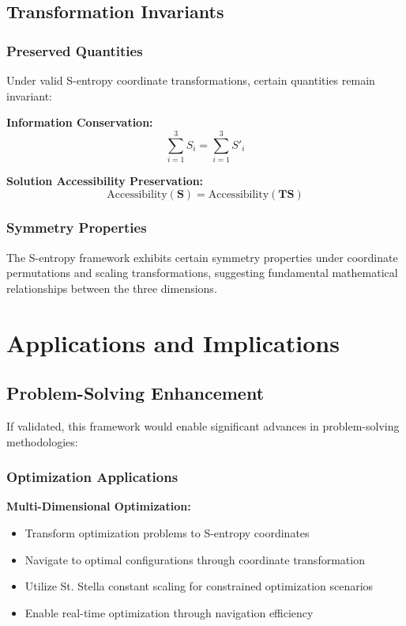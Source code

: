 \documentclass[11pt]{article}
\begin{document}
\subsection{Transformation Invariants}

\subsubsection{Preserved Quantities}

Under valid S-entropy coordinate transformations, certain quantities remain invariant:

\textbf{Information Conservation:}
\begin{equation}
\sum_{i=1}^{3} S_i = \sum_{i=1}^{3} S'_i
\label{eq:information_conservation}
\end{equation}

\textbf{Solution Accessibility Preservation:}
\begin{equation}
\text{Accessibility}(\mathbf{S}) = \text{Accessibility}(\mathbf{T}\mathbf{S})
\label{eq:accessibility_preservation}
\end{equation}

\subsubsection{Symmetry Properties}

The S-entropy framework exhibits certain symmetry properties under coordinate permutations and scaling transformations, suggesting fundamental mathematical relationships between the three dimensions.

\section{Applications and Implications}

\subsection{Problem-Solving Enhancement}

If validated, this framework would enable significant advances in problem-solving methodologies:

\subsubsection{Optimization Applications}

\textbf{Multi-Dimensional Optimization:}
\begin{itemize}
\item Transform optimization problems to S-entropy coordinates
\item Navigate to optimal configurations through coordinate transformation
\item Utilize St. Stella constant scaling for constrained optimization scenarios
\item Enable real-time optimization through navigation efficiency
\end{itemize}
\end{document}
